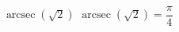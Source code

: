  {$\operatorname{arcsec} \left( \sqrt{2} \right)$}
{ $\operatorname{arcsec} \left( \sqrt{2} \right) = \dfrac{\pi}{4}$}
